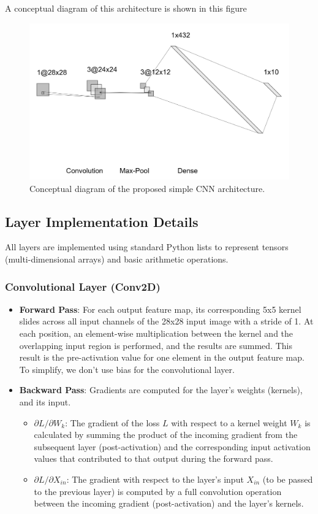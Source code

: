 \documentclass[conference]{IEEEtran}
\begin{document}
A conceptual diagram of this architecture is shown in this figure

\begin{figure}[htbp]
    \centering
    \includegraphics[width=0.9\columnwidth]{architecture.png}
    \caption{Conceptual diagram of the proposed simple CNN architecture.}
    \label{fig:cnn_architecture}
\end{figure}

\subsection{Layer Implementation Details}
All layers are implemented using standard Python lists to represent tensors (multi-dimensional arrays) and basic arithmetic operations.

\subsubsection{Convolutional Layer (Conv2D)}
\begin{itemize}
    \item \textbf{Forward Pass}: For each output feature map, its corresponding 5x5 kernel slides across all input channels of the 28x28 input image with a stride of 1. At each position, an element-wise multiplication between the kernel and the overlapping input region is performed, and the results are summed. This result is the pre-activation value for one element in the output feature map. To simplify, we don't use bias for the convolutional layer.
    \item \textbf{Backward Pass}: Gradients are computed for the layer's weights (kernels), and its input.
        \begin{itemize}
            \item $\partial L / \partial W_{k}$: The gradient of the loss $L$ with respect to a kernel weight $W_{k}$ is calculated by summing the product of the incoming gradient from the subsequent layer (post-activation) and the corresponding input activation values that contributed to that output during the forward pass.
            \item $\partial L / \partial X_{in}$: The gradient with respect to the layer's input $X_{in}$ (to be passed to the previous layer) is computed by a full convolution operation between the incoming gradient (post-activation) and the layer's kernels.
        \end{itemize}
\end{itemize}
\end{document}
